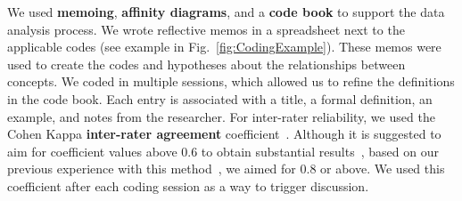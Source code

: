 We used \textbf{memoing}, \textbf{affinity diagrams}, and a \textbf{code book} to support the data analysis process. We wrote reflective memos in a spreadsheet next to the applicable codes (see example in Fig.~\ref{fig:CodingExample}). These memos were used to create the codes and hypotheses about the relationships between concepts. We coded in multiple sessions, which allowed us to refine the definitions in the code book. Each entry is associated with a title, a formal definition, an example, and notes from the researcher. %
For inter-rater reliability, we used the Cohen Kappa \textbf{inter-rater agreement} coefficient~\cite{Stemler2004}. Although it is suggested to aim for coefficient values above 0.6 to obtain substantial results~\cite{Landis1977}, based on our previous experience with this method~\cite{Gomez2013}, we aimed for 0.8 or above. We used this coefficient after each coding session as a way to trigger discussion.






